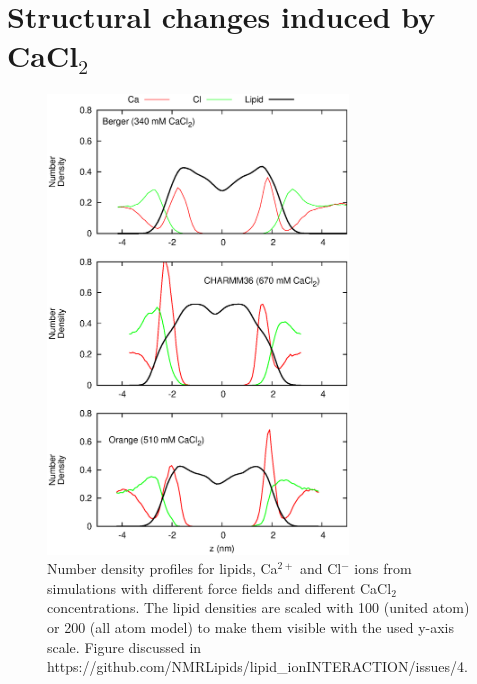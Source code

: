 \documentclass[pre,aps,floatfix,authordate1-4,twocolumn]{revtex4-1}
\begin{document}
\section{Structural changes induced by CaCl$_2$}
\begin{figure}[]
  \centering
  \includegraphics[width=8cm]{../Fig/CAdensities.eps}
  \caption{\label{CAdensities}
    Number density profiles for lipids, Ca$^{2+}$ and Cl$^-$ ions from simulations with different force fields 
    and different CaCl$_2$ concentrations. 
    The lipid densities are scaled with 100 (united atom) or 200 (all atom model) to make them visible with the used y-axis scale.
    Figure discussed in https://github.com/NMRLipids/lipid\_ionINTERACTION/issues/4.
  }
\end{figure}
\end{document}
